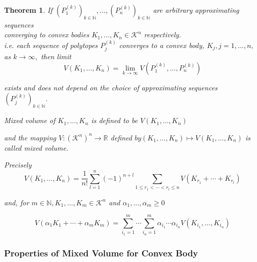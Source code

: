 \documentclass[oneside]{book}
\newtheorem{theorem}{Theorem}[section]
\theoremstyle{definition}
\begin{document}
 \begin{theorem}
 \label{t:10}
  If $\left(P_{1}^{(k)}\right)_{k \in \mathbb{N}}, \ldots,\left(P_{n}^{(k)}\right)_{k \in \mathbb{N}}$ are arbitrary approximating sequences\\
  
   converging to convex bodies  $K_{1}, \ldots, K_{n} \in \mathcal{K}^{n}$ respectively.
  \\
   i.e. each sequence of polytopes $P_{j}^{(k)}$ converges to a convex body, 
   $K_{j}, j=1, \ldots, n,$ as $k \rightarrow \infty,$ 
  then limit 
  \begin{equation}
  \label{eq51}
V\left(K_{1}, \ldots, K_{n}\right)=\lim _{k \rightarrow \infty} V\left(P_{1}^{(k)}, \ldots, P_{n}^{(k)}\right)
\end{equation}


exists and does not depend on the choice of approximating sequences $\left(P_{j}^{(k)}\right)_{k \in \mathbb{N}}. $ \newline

 Mixed volume of $K_{1}, \ldots, K_{n} $ is defined to be $V\left(K_{1}, \ldots, K_{n}\right)$ \newline
 
  and the mapping $V:\left(\mathcal{K}^{n}\right)^{n} \rightarrow \mathbb{R}$ defined $b y\left(K_{1}, \ldots, K_{n}\right) \mapsto V\left(K_{1}, \ldots, K_{n}\right)$ is called mixed volume.\newline
  
Precisely 
\begin{equation} 
\label{eq52}
V\left(K_{1}, \ldots, K_{n}\right)=\frac{1}{n !} \sum_{l=1}^{n}(-1)^{n+l} \sum_{1 \leq r_{1}<\cdots<r_{l} \leq n} V\left(K_{r_{1}}+\cdots+K_{r_{l}}\right)
\end{equation}


and, for $m \in \mathbb{N}, K_{1}, \ldots, K_{m} \in \mathcal{K}^{n}$ and $\alpha_{1}, \ldots, \alpha_{m} \geq 0$
 
 
\begin{equation}
\label{eq53}
V\left(\alpha_{1} K_{1}+\cdots+\alpha_{m} K_{m}\right)=\sum_{i_{1}=1}^{m} \cdots \sum_{i_{n}=1}^{m} \alpha_{i_{1}} \cdots \alpha_{i_{n}} V\left(K_{i_{1}}, \ldots, K_{i_{n}}\right)
\end{equation}
 \end{theorem}
 
 \subsubsection{Properties of Mixed Volume for Convex Body}
 
\end{document}
